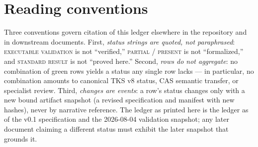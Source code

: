 \section{Reading conventions}\label{appB:sec:conventions}

Three conventions govern citation of this ledger elsewhere in the
repository and in downstream documents. First, \emph{status strings
are quoted, not paraphrased}: \textsc{executable validation} is not
``verified,'' \textsc{partial / present} is not ``formalized,'' and
\textsc{standard result} is not ``proved here.'' Second, \emph{rows do
not aggregate}: no combination of green rows yields a status any
single row lacks --- in particular, no combination amounts to
canonical TKS v8 status, CAS semantic transfer, or specialist review.
Third, \emph{changes are events}: a row's status changes only with a
new bound artifact snapshot (a revised specification and manifest with
new hashes), never by narrative reference. The ledger as printed here
is the ledger as of the v0.1 specification and the 2026-08-04
validation snapshot; any later document claiming a different status
must exhibit the later snapshot that grounds it.
